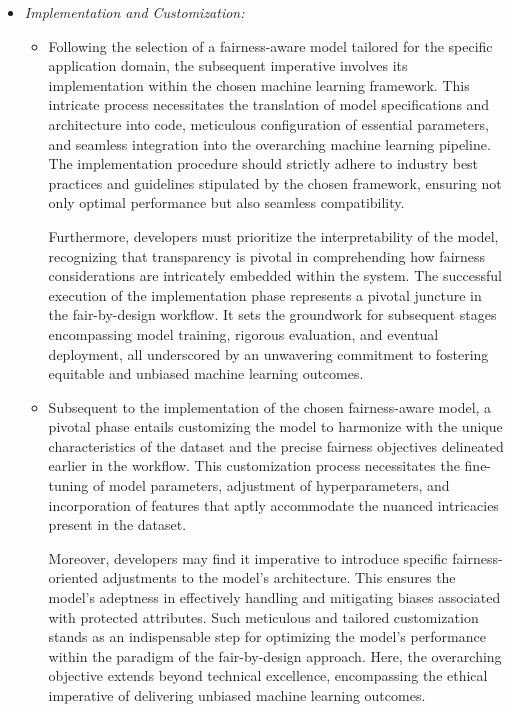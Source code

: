 \documentclass[12pt,a4paper,openright,twoside]{book}
\begin{document}
\begin{itemize}
\begin{itemize}
    \end{itemize}
    
    \item \emph{Implementation and Customization:}
    
    \begin{itemize}
    
        \item Following the selection of a fairness-aware model tailored for the specific application domain, the subsequent imperative involves its implementation within the chosen machine learning framework. This intricate process necessitates the translation of model specifications and architecture into code, meticulous configuration of essential parameters, and seamless integration into the overarching machine learning pipeline. The implementation procedure should strictly adhere to industry best practices and guidelines stipulated by the chosen framework, ensuring not only optimal performance but also seamless compatibility.

        Furthermore, developers must prioritize the interpretability of the model, recognizing that transparency is pivotal in comprehending how fairness considerations are intricately embedded within the system. The successful execution of the implementation phase represents a pivotal juncture in the fair-by-design workflow. It sets the groundwork for subsequent stages encompassing model training, rigorous evaluation, and eventual deployment, all underscored by an unwavering commitment to fostering equitable and unbiased machine learning outcomes.    
    
        \item Subsequent to the implementation of the chosen fairness-aware model, a pivotal phase entails customizing the model to harmonize with the unique characteristics of the dataset and the precise fairness objectives delineated earlier in the workflow. This customization process necessitates the fine-tuning of model parameters, adjustment of hyperparameters, and incorporation of features that aptly accommodate the nuanced intricacies present in the dataset.

        Moreover, developers may find it imperative to introduce specific fairness-oriented adjustments to the model's architecture. This ensures the model's adeptness in effectively handling and mitigating biases associated with protected attributes. Such meticulous and tailored customization stands as an indispensable step for optimizing the model's performance within the paradigm of the fair-by-design approach. Here, the overarching objective extends beyond technical excellence, encompassing the ethical imperative of delivering unbiased machine learning outcomes.    
    
    \end{itemize}

\end{itemize}
\end{document}
